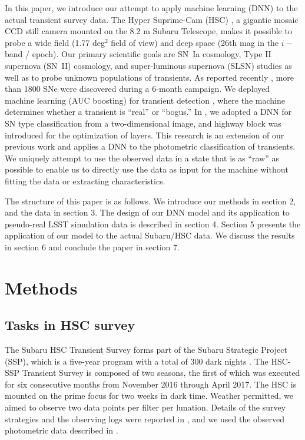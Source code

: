 \documentclass[useamsfonts]{pasj01}
\begin{document}
In this paper, we introduce our attempt to apply machine learning (DNN) to the actual transient survey data.
The Hyper Suprime-Cam (HSC) \citep{miyazaki18a,Komiyama2018,kawanomoto18a,Furusawa2018}, a gigantic mosaic CCD still camera mounted on the 8.2 m Subaru Telescope, makes it possible to probe a wide field (1.77 deg$^2$ field of view) and deep space (26th mag in the $i-$band / epoch).  Our primary scientific goals are SN~Ia cosmology, Type II supernova (SN~II) cosmology, and super-luminous supernova (SLSN) studies as well as to probe unknown populations of transients.  
As reported recently \citet{yasuda19a}, more than 1800 SNe were discovered during a 6-month campaign. 
We deployed machine learning (AUC boosting) for transient detection \citep{morii16a}, where the machine determines whether a transient is ``real'' or ``bogus.''
In \citet{Kimura17}, we adopted a DNN for SN type classification from a two-dimensional image, and highway block was introduced for the optimization of layers.
This research is an extension of our previous work \citet{Kimura17} and applies a DNN to the photometric classification of transients.   
We uniquely attempt to use the observed data in a state that is as ``raw'' as possible to enable us to directly use the data as input for the machine without fitting the data or extracting characteristics.

The structure of this paper is as follows. We introduce our methods in section 2, and the data in section 3. The design of our DNN model and its application to pseudo-real LSST simulation data is described in section 4. Section 5 presents the application of our model to the actual Subaru/HSC data. We discuss the results in section 6 and conclude the paper in section 7.
%
%

\section{Methods}
\subsection{Tasks in HSC survey}
\label{sec:tasks}
The Subaru HSC Transient Survey forms part of the Subaru Strategic Project (SSP), which is a five-year program with a total of 300 dark nights \citep{aihara18a,miyazaki18a}.
The HSC-SSP Transient Survey is composed of two seasons, the first of which was executed for six consecutive months from November 2016 through April 2017.
The HSC is mounted on the prime focus for two weeks in dark time.   
Weather permitted, we aimed to observe two data points per filter per lunation.
Details of the survey strategies and the observing logs were reported in \citet{yasuda19a}, and we used the observed photometric data described in \citet{yasuda19a}.
\end{document}
